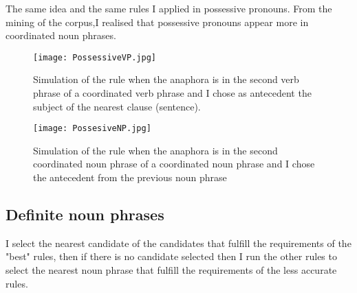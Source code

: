 The same idea and the same rules I applied in possessive pronouns. From the mining of the corpus,I realised that possessive pronouns appear more in coordinated noun phrases. 
\newpage
\begin{figure}[h]
  \begin{center}
	\texttt{[image: PossessiveVP.jpg]} 
 	\caption[Simulation of  a rules in possessive pronouns]{Simulation of  the rule when the anaphora is in the second verb phrase of a coordinated verb phrase and I chose as antecedent the subject of the nearest clause (sentence).\footnotemark}
	\label{Figure 14}
  \end{center}
 \end{figure}
 
\newpage

\begin{figure}[h]
  \begin{center}
	\texttt{[image: PossesiveNP.jpg]} 
 	\caption[Simulation of  a rules in possessive pronouns]{Simulation of  the rule when the anaphora  is in the second coordinated noun phrase of a coordinated noun phrase and I chose the antecedent from the previous noun phrase\footnotemark}
	\label{Figure 15}
  \end{center}
\end{figure}


\subsection{Definite noun phrases} 

I select the nearest candidate of the candidates that fulfill the requirements of the "best" rules, then if there is no candidate selected then I run the other rules to select the nearest noun phrase that fulfill the requirements of the less accurate rules.  
